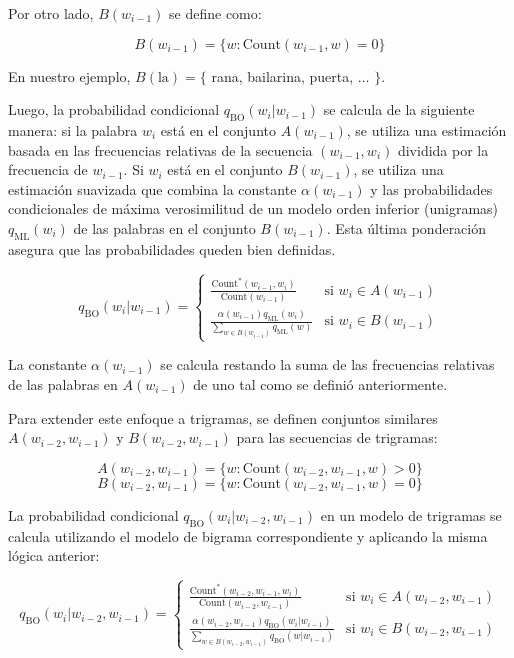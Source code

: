 \documentclass[11pt,fleqn]{book} %
\begin{document}
Por otro lado, $B(w_{i-1})$ se define como:

\[
B(w_{i-1}) = \{w : \text{Count}(w_{i-1}, w) = 0\}
\]

En nuestro ejemplo, $B(\text{la}) = \{$ rana, bailarina, puerta, $\dots$ $\}$.

Luego, la probabilidad condicional $q_{\text{BO}}(w_i | w_{i-1})$ se calcula de la siguiente manera: si la palabra $w_i$ está en el conjunto $A(w_{i-1})$, se utiliza una estimación basada en las frecuencias relativas de la secuencia $(w_{i-1}, w_i)$ dividida por la frecuencia de $w_{i-1}$. Si $w_i$ está en el conjunto $B(w_{i-1})$, se utiliza una estimación suavizada que combina la constante $\alpha(w_{i-1})$ y las probabilidades condicionales de máxima verosimilitud  de un modelo orden inferior (unigramas) $q_{\text{ML}}(w_i)$ de las palabras en el conjunto $B(w_{i-1})$. Esta última ponderación asegura que las probabilidades queden bien definidas.

\[
q_{\text{BO}}(w_i | w_{i-1}) =
\begin{cases}
    \frac{\text{Count}^*(w_{i-1}, w_i)}{\text{Count}(w_{i-1})} & \text{si } w_i \in A(w_{i-1}) \\
    \frac{\alpha(w_{i-1}) q_{\text{ML}}(w_i)}{\sum_{w \in B(w_{i-1})} q_{\text{ML}}(w)} & \text{si } w_i \in B(w_{i-1})
\end{cases}
\]

La constante $\alpha(w_{i-1})$ se calcula restando la suma de las frecuencias relativas de las palabras en $A(w_{i-1})$ de uno tal como se definió anteriormente.



Para extender este enfoque a trigramas, se definen conjuntos similares $A(w_{i-2}, w_{i-1})$ y $B(w_{i-2}, w_{i-1})$ para las secuencias de trigramas:

\[
A(w_{i-2}, w_{i-1}) = \{w : \text{Count}(w_{i-2}, w_{i-1}, w) > 0\}
\]
\[
B(w_{i-2}, w_{i-1}) = \{w : \text{Count}(w_{i-2}, w_{i-1}, w) = 0\}
\]

La probabilidad condicional $q_{\text{BO}}(w_i | w_{i-2}, w_{i-1})$ en un modelo de trigramas se calcula utilizando el modelo de bigrama correspondiente y aplicando la misma lógica anterior:

\[
q_{\text{BO}}(w_i | w_{i-2}, w_{i-1}) =
\begin{cases}
    \frac{\text{Count}^*(w_{i-2}, w_{i-1}, w_i)}{\text{Count}(w_{i-2}, w_{i-1})} & \text{si } w_i \in A(w_{i-2}, w_{i-1}) \\
    \frac{\alpha(w_{i-2}, w_{i-1}) q_{\text{BO}}(w_i|w_{i-1})}{\sum_{w \in B(w_{i-2}, w_{i-1})} q_{\text{BO}}(w|w_{i-1})} & \text{si } w_i \in B(w_{i-2}, w_{i-1})
\end{cases}
\]
\end{document}
